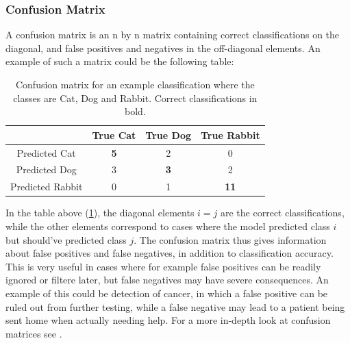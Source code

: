 \subsubsection{Confusion Matrix}
A confusion matrix is an n by n matrix containing correct classifications
on the diagonal, and false positives and negatives in the off-diagonal elements.
An example of such a matrix could be the following table:
\begin{table}[h]
    \centering
    \begin{tabular}{c|c|c|c}
     & True Cat & True Dog & True Rabbit \\
    \hline
    Predicted Cat & \textbf{5} & 2 & 0 \\
    \hline
    Predicted Dog & 3 & \textbf{3} & 2 \\
    \hline
    Predicted Rabbit & 0 & 1 & \textbf{11} \\
\end{tabular}
\caption{Confusion matrix for an example classification where the classes
         are Cat, Dog and Rabbit. Correct classifications in bold.}
\label{tab:confmat-example}
\end{table}
In the table above (\ref{tab:confmat-example}), the diagonal elements
$i = j$ are the correct classifications, while the other elements correspond
to cases where the model predicted class $i$ but should've predicted class $j$.
The confusion matrix thus gives information about false positives and false 
negatives, in addition to classification accuracy. This is very useful
in cases where for example false positives can be readily ignored or filtere
later, but false negatives may have severe consequences. An example of this
could be detection of cancer, in which a false positive can be ruled out
from further testing, while a false negative may lead to a patient being sent
home when actually needing help. For a more in-depth look at confusion matrices
see \cite{roc-article}.
